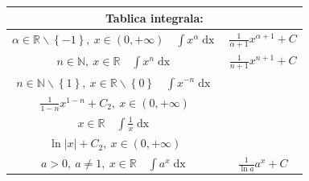 \documentclass[11pt]{article}
\theoremstyle{plain}
\theoremstyle{serbnodot}
\DeclareMathOperator{\dx}{dx}
\begin{document}
\begin{tabular}{ |c|c| }
    \hline
    \multicolumn{2}{|c|}{Tablica integrala:}                                                                                                                                                                                                        \\ \hline
    $\displaystyle\alpha \in \mathbb{R} \backslash \left\{-1\right\},\ x\in\left(0, +\infty\right)\quad \int x^{\alpha} \dx$                   & $\displaystyle\frac{1}{\alpha + 1} x^{\alpha + 1} + C$                                             \\ \hline
    $\displaystyle n \in \mathbb{N},\ x \in \mathbb{R} \quad \int x^{n} \dx$                                                                   & $\displaystyle\frac{1}{n + 1} x^{n + 1} + C$                                                       \\ \hline
    $\displaystyle n \in \mathbb{N}\backslash\left\{1\right\},\ x \in\mathbb{R}\backslash\left\{0\right\}\quad \int x^{-n} \dx $               &
    \makecell{
    $\displaystyle\frac{1}{1-n} x^{1-n} + C_1,\ x \in \left(-\infty, 0\right)$                                                                                                                                                                      \\
        $\displaystyle\frac{1}{1-n} x^{1-n} + C_2,\ x \in \left(0, +\infty\right)$
    }                                                                                                                                                                                                                                               \\  \hline
    $\displaystyle x \in \mathbb{R} \quad \int \frac{1}{x} \dx$                                                                                     &
    \makecell{ $\ln |x| + C_1,\ x \in \left(-\infty, 0\right)$                                                                                                                                                                                      \\
    $\displaystyle\ln |x| + C_2,\ x \in \left(0, +\infty\right)$}                                                                                                                                                                                   \\ \hline
    $\displaystyle a > 0,\ a\neq 1,\ x \in \mathbb{R} \quad \int a^x \dx$                                                                      & $ \displaystyle\frac{1}{\ln a} a^x + C$                                                            \\ \hline

\end{tabular}
\end{document}
